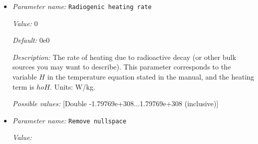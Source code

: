 \begin{itemize}
{\it Default:} 


{\it Description:} A comma separated list denoting those boundaries on which the velocity is tangential but prescribed, i.e., where external forces act to prescribe a particular velocity. This is often used to prescribe a velocity that equals that of overlying plates.

The format of valid entries for this parameter is that of a map given as ``key1 [selector]: value1, key2 [selector]: value2, key3: value3, ...'' where each key must be a valid boundary indicator (which is an integer) and each value must be one of the currently implemented boundary velocity models. selector is an optional string given as a subset of the letters 'xyz' that allows you to apply the boundary conditions only to the components listed. As an example, '1 y: function' applies the type 'function' to the y component on boundary 1. Without a selector it will effect all components of the velocity.

Note that the no-slip boundary condition is a special case of the current one where the prescribed velocity happens to be zero. It can thus be implemented by indicating that a particular boundary is part of the ones selected using the current parameter and using ``zero velocity'' as the boundary values. Alternatively, you can simply list the part of the boundary on which the velocity is to be zero with the parameter ``Zero velocity boundary indicator'' in the current parameter section.


{\it Possible values:} [Map map of <[Anything]:[Selection inclusion|function|gplates|zero velocity ]> of length 0...4294967295 (inclusive)]
\item {\it Parameter name:} {\tt Radiogenic heating rate}


{\it Value:} 0


{\it Default:} 0e0


{\it Description:} The rate of heating due to radioactive decay (or other bulk sources you may want to describe). This parameter corresponds to the variable $H$ in the temperature equation stated in the manual, and the heating term is $
ho H$. Units: W/kg.


{\it Possible values:} [Double -1.79769e+308...1.79769e+308 (inclusive)]
\item {\it Parameter name:} {\tt Remove nullspace}


{\it Value:} 



\end{itemize}

